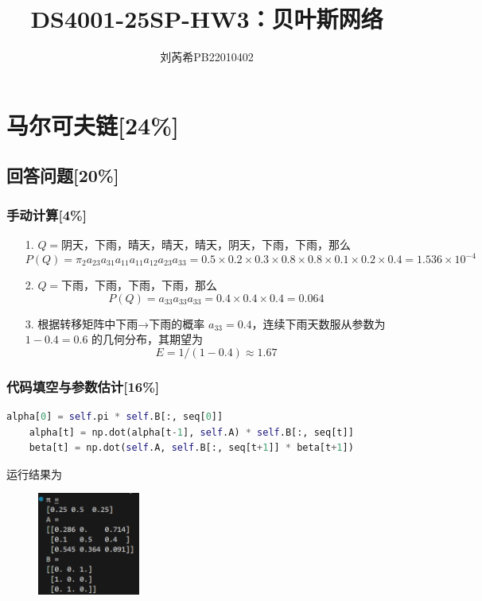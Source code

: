 \documentclass{article}
\title{\bfseries DS4001-25SP-HW3：贝叶斯网络}
\author{刘芮希\quad PB22010402}
\begin{document}
\maketitle

\section{马尔可夫链[24\%]}
\subsection{回答问题[20\%]}
\subsubsection{手动计算[4\%]}

\begin{enumerate}
    
    \item[1.] $Q = $阴天，下雨，晴天，晴天，晴天，阴天，下雨，下雨，那么$$P(Q) = \pi_2 a_{23}a_{31}a_{11}a_{11}a_{12}a_{23}a_{33} = 0.5 \times 0.2 \times 0.3 \times 0.8 \times 0.8 \times 0.1 \times 0.2 \times 0.4 = 1.536 \times 10^{-4}$$ 
    
    \item[2.] $Q = $下雨，下雨，下雨，下雨，那么$$P(Q) = a_{33} a_{33} a_{33} = 0.4 \times 0.4 \times 0.4 = 0.064$$ 

    \item[3.] 根据转移矩阵中下雨→下雨的概率 $a_{33}=0.4$，连续下雨天数服从参数为 $1-0.4=0.6$ 的几何分布，其期望为$$E = 1/(1-0.4) \approx 1.67$$ 

\end{enumerate}

\subsubsection{代码填空与参数估计[16\%]}
\begin{lstlisting}[language=Python]
	alpha[0] = self.pi * self.B[:, seq[0]]
	alpha[t] = np.dot(alpha[t-1], self.A) * self.B[:, seq[t]]
	beta[t] = np.dot(self.A, self.B[:, seq[t+1]] * beta[t+1])
\end{lstlisting}
运行结果为
\begin{figure}
	\centering
	\includegraphics[width=0.3\textwidth]{1.png}
\end{figure}
\end{document}

